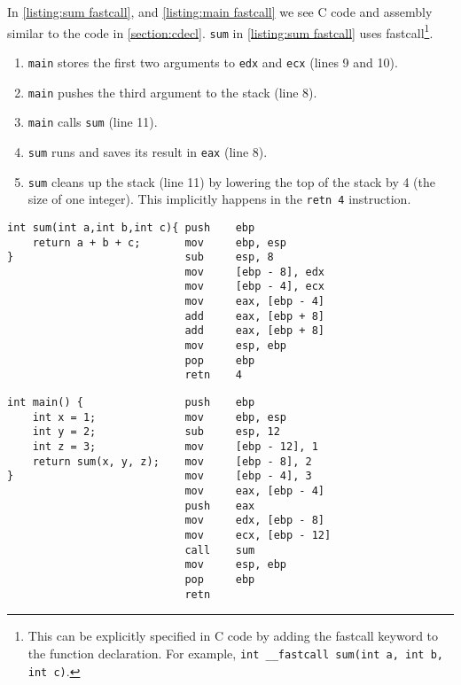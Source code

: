 In \autoref{listing:sum fastcall}, and \autoref{listing:main fastcall} we see C code and assembly similar to the code in \autoref{section:cdecl}. \texttt{sum} in \autoref{listing:sum fastcall} uses fastcall\footnote{This can be explicitly specified in C code by adding the fastcall keyword to the function declaration. For example, \texttt{int \_\_fastcall sum(int a, int b, int c)}.}.

\begin{enumerate}
    \item \texttt{main} stores the first two arguments to \texttt{edx} and \texttt{ecx} (lines 9 and 10).
    \item \texttt{main} pushes the third argument to the stack (line 8).
    \item \texttt{main} calls \texttt{sum} (line 11).
    \item \texttt{sum} runs and saves its result in \texttt{eax} (line 8).
    \item \texttt{sum} cleans up the stack (line 11) by lowering the top of the stack by 4 (the size of one integer). This implicitly happens in the \texttt{retn 4} instruction.
\end{enumerate}

\begin{lstlisting}[label={listing:sum fastcall}, caption={The C code and assembly of a function that uses fastcall.}, captionpos=b]
int sum(int a,int b,int c){ push    ebp
    return a + b + c;       mov     ebp, esp
}                           sub     esp, 8
                            mov     [ebp - 8], edx
                            mov     [ebp - 4], ecx
                            mov     eax, [ebp - 4]
                            add     eax, [ebp + 8]
                            add     eax, [ebp + 8]
                            mov     esp, ebp
                            pop     ebp
                            retn    4
\end{lstlisting}

\begin{lstlisting}[label={listing:main fastcall}, caption={The C code and assembly of a function calling the function from \autoref{listing:sum fastcall} using fastcall.}, captionpos=b]
int main() {                push    ebp
    int x = 1;              mov     ebp, esp
    int y = 2;              sub     esp, 12
    int z = 3;              mov     [ebp - 12], 1
    return sum(x, y, z);    mov     [ebp - 8], 2
}                           mov     [ebp - 4], 3
                            mov     eax, [ebp - 4]
                            push    eax
                            mov     edx, [ebp - 8]
                            mov     ecx, [ebp - 12]
                            call    sum
                            mov     esp, ebp
                            pop     ebp
                            retn
\end{lstlisting}
